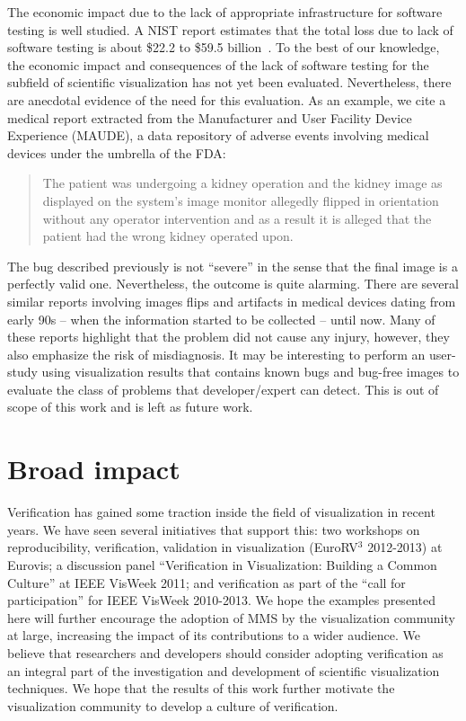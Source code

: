 The economic impact due to the lack of appropriate infrastructure for software testing is well studied.
%
A NIST report estimates that the total loss due to lack of software testing is about \$22.2 to \$59.5 billion~\cite{tassey2002economic}. 
%
To the best of our knowledge, the economic impact and consequences of the lack of software testing for the subfield of scientific visualization has not yet been evaluated. 
%
Nevertheless, there are anecdotal evidence of the need for this evaluation. As an example, we cite a medical report extracted from the Manufacturer and User Facility Device Experience (MAUDE), a data repository of adverse events involving medical devices under the umbrella of the FDA:
\begin{quote}
The patient was undergoing a kidney operation and the kidney image as displayed on the system's image monitor allegedly flipped in orientation without any operator intervention and as a result it is alleged that the patient had the wrong kidney operated upon.
\end{quote}
The bug described previously is not  ``severe'' in the sense that the final image is a perfectly valid one. Nevertheless, the outcome is quite alarming. There are several similar reports involving images flips and artifacts in medical devices dating from early 90s -- when the information started to be collected -- until now. Many of these reports highlight that the problem did not cause any injury, however, they also emphasize the risk of misdiagnosis.
%
It may be interesting to perform an user-study using visualization results that contains known bugs and bug-free images to evaluate the class of problems that developer/expert can detect.  This is out of scope of this work and is left as future work.


\section{Broad impact}

Verification has gained some traction inside the field of visualization in recent years.  
%
We have seen several initiatives that support this: two workshops on reproducibility, verification, validation in visualization (EuroRV$^3$ 2012-2013) at Eurovis; a discussion panel ``Verification in Visualization: Building a Common Culture'' at IEEE VisWeek 2011; and verification as part of the ``call for participation'' for IEEE VisWeek 2010-2013.
%
We hope the  examples presented here will further encourage the adoption of MMS by the visualization community at large, increasing the impact of its contributions  to a wider audience.
%
We believe that researchers and developers should consider adopting verification as an integral part of the investigation and development of scientific visualization techniques.
%
We hope that the results of this work further motivate the visualization
community to develop a culture of verification.


